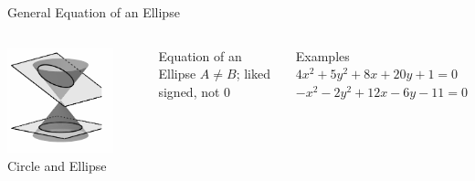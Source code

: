 \documentclass[14pt,aspectratio=169]{beamer}
\begin{document}
\begin{frame}{General Equation of an Ellipse}
 \begin{columns}
      \centering
        \includegraphics[width=0.8\textwidth]{image08.png}\\Circle and Ellipse
        \begin{block}{Equation of an Ellipse}\centering
        $A\neq B$; liked signed, not $0$
        \end{block}

        \begin{exampleblock}{Examples}
         $4x^2 + 5y^2 + 8x + 20y + 1 = 0$ \\
         $-x^2 - 2y^2 + 12x - 6y - 11 = 0$
        \end{exampleblock}

    \end{columns}
\end{frame}
\end{document}
